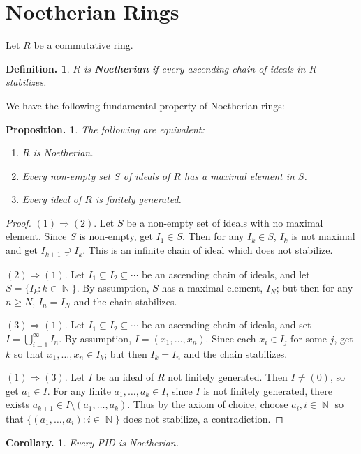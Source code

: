 \documentclass[11pt, a4paper]{memoir}
\DeclareMathOperator{\N}{{\mathbb{N}}}
\theoremstyle{change}
\newtheorem{corollary}[theorem]{Corollary.}
\newtheorem{proposition}[theorem]{Proposition.}
\theoremstyle{plain}
\theoremstyle{nonumberplain}
\newtheorem{definition}{Definition.}
\newtheorem{proof}{Proof}
\numberwithin{equation}{section}
\begin{document}
\section{Noetherian Rings}
Let $R$ be a commutative ring.
\begin{definition}
    $R$ is \textbf{Noetherian} if every ascending chain of ideals in $R$ stabilizes.
\end{definition}
We have the following fundamental property of Noetherian rings:
\begin{proposition}\label{noe}
    The following are equivalent:
    \begin{enumerate}[nolistsep]
        \item $R$ is Noetherian.
        \item Every non-empty set $S$ of ideals of $R$ has a maximal element in $S$.
        \item Every ideal of $R$ is finitely generated.
    \end{enumerate}
\end{proposition}
\begin{proof}
    $(1)\Rightarrow (2)$.
    Let $S$ be a non-empty set of ideals with no maximal element.
    Since $S$ is non-empty, get $I_1\in S$.
    Then for any $I_k\in S$, $I_k$ is not maximal and get $I_{k+1}\supsetneq I_k$.
    This is an infinite chain of ideal which does not stabilize.

    $(2)\Rightarrow(1)$.
    Let $I_1\subseteq I_2\subseteq\cdots$ be an ascending chain of ideals, and let $S=\{I_k:k\in\N\}$.
    By assumption, $S$ has a maximal element, $I_N$; but then for any $n\geq N$, $I_n=I_N$ and the chain stabilizes.

    $(3)\Rightarrow(1)$.
    Let $I_1\subseteq I_2\subseteq\cdots$ be an ascending chain of ideals, and set $I=\bigcup_{i=1}^\infty I_n$.
    By assumption, $I=(x_1,\ldots,x_n)$.
    Since each $x_i\in I_j$ for some $j$, get $k$ so that $x_1,\ldots,x_n\in I_k$; but then $I_k=I_n$ and the chain stabilizes.

    $(1)\Rightarrow(3)$.
    Let $I$ be an ideal of $R$ not finitely generated.
    Then $I\neq(0)$, so get $a_1\in I$.
    For any finite $a_1,\ldots,a_k\in I$, since $I$ is not finitely generated, there exists $a_{k+1}\in I\setminus(a_1,\ldots,a_k)$.
    Thus by the axiom of choice, choose $a_i,i\in\N$ so that $\{(a_1,\ldots,a_i):i\in\N\}$ does not stabilize, a contradiction.
\end{proof}
\begin{corollary}
    Every PID is Noetherian.
\end{corollary}
\end{document}
